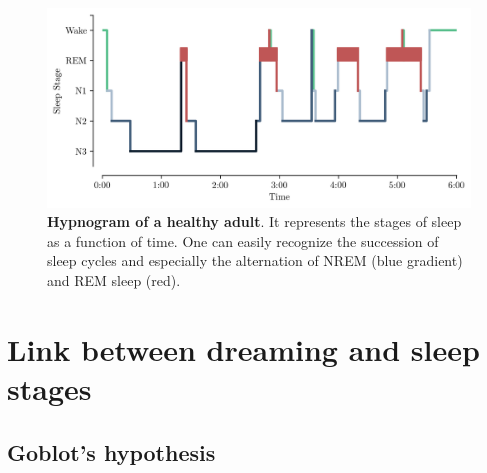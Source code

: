 \vspace{10mm}

\begin{figure}[htb]
	\includegraphics[width=\textwidth]{Fig/Intro/Intro_Hypnogram/Intro_Hypnogram.png}
	\caption[Hypnogram of a healthy adult]{\textbf{Hypnogram of a healthy adult}. It represents the stages of sleep as a function of time. One can easily recognize the succession of sleep cycles and especially the alternation of NREM (blue gradient) and REM sleep (red).}
	\label{fig:intro:hypno}
\end{figure}

%

\section{Link between dreaming and sleep stages}
\label{sec:dream-research:link}

\subsection{Goblot's hypothesis}
\label{sec:dream-research:link:goblot}

